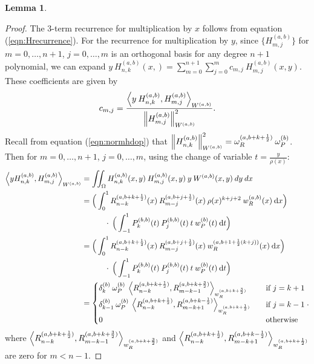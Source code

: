 \documentclass[11pt, oneside]{article}   	%
\newcommand{\half}{\frac{1}{2}}
\newcommand{\hdop}{H}
\newcommand{\hdopnkab}{\hdop_{n,k}^{(a,b)}}
\newcommand{\Wab}{{W^{(a,b)}}}
\newcommand{\hdopmjab}{\hdop_{m,j}^{(a,b)}}
\newcommand{\genjac}{R}
\newcommand{\genjacnmk}{\genjac_{n-k}}
\newcommand{\genjacmmj}{\genjac_{m-j}}
\newcommand{\genjacw}{w_\genjac}
\newcommand{\normgenjac}{\omega_\genjac}
\newcommand{\normjac}{\omega_P}
\newtheorem{lemma}{Lemma}
\begin{document}
\begin{lemma}
\end{lemma}

\begin{proof}
The 3-term recurrence for multiplication by $x$ follows from equation (\ref{eqn:Hrecurrence}). For the recurrence for multiplication by $y$, since $\{\hdopmjab\}$ for $m = 0,\dots,n+1$, $j = 0,\dots,m$ is an orthogonal basis for any degree $n+1$ polynomial, we can expand $y \: \hdopnkab(x,) = \sum_{m=0}^{n+1} \sum_{j=0}^m c_{m,j} \: \hdopmjab(x,y)$. These coefficients are given by
\begin{align*}
	c_{m,j} = \frac{\ip< y \: \hdopnkab, \hdopmjab >_{\Wab}}{\norm{\hdopmjab}^2_{\Wab}}.
\end{align*}
Recall from equation (\ref{eqn:normhdop}) that $\norm{\hdopnkab}_{\Wab}^2 = \normgenjac^{(a,b+k+\half)} \: \normjac^{(b)}$. Then for $m = 0,\dots,n+1$, $j = 0,\dots,m$, using the change of variable $t = \frac{y}{\rho(x)}$:
\begin{align*}
	\ip<y \hdopnkab, \hdopmjab>_\Wab &=  \iint_\Omega \hdopnkab(x,y) \: \hdopmjab(x,y) \: y \: \Wab(x,y) \: dy \: dx \\
	&= \Big( \int^1_0 \genjacnmk^{(a, b+k+\half)}(x) \: \genjacmmj^{(a, b+j+\half)}(x) \: \rho(x)^{k+j+2} \: \genjacw^{(a, b)}(x) \: \D x \Big) \nonumber \\
	& \quad \quad \quad\cdot \: \Big( \int^1_{-1} P_k^{(b,b)}(t) \: P_j^{(b,b)}(t) \: t \: w_P^{(b)}(t) \: \D t \Big) \\
	&= \Big( \int^1_0 \genjacnmk^{(a, b+k+\half)}(x) \: \genjacmmj^{(a, b+j+\half)}(x) \: \genjacw^{(a, b+1+\half(k+j))}(x) \: \D x \Big) \nonumber \\
	& \quad \quad \quad\cdot \: \Big( \int^1_{-1} P_k^{(b,b)}(t) \: P_j^{(b,b)}(t) \: t \: w_P^{(b)}(t) \: \D t \Big) \\
	&= 
	\begin{cases}
    		\delta_k^{(b)} \: \normjac^{(b)} \: \ip<\genjacnmk^{(a, b+k+\half)}, \genjac_{m-k-1}^{(a, b+k+\frac{3}{2})}>_{\genjacw^{(a, b+k+\frac{3}{2})}} \quad& \text{if } j = k+1 \\
		\delta_{k-1}^{(b)} \: \normjac^{(b)} \: \ip<\genjacnmk^{(a, b+k+\half)}, \genjac_{m-k+1}^{(a, b+k-\half)}>_{\genjacw^{(a, b+k+\half)}} \quad& \text{if } j = k-1 \\
		0 & \text{otherwise}
      	\end{cases}.
\end{align*}
where $\ip<\genjacnmk^{(a, b+k+\half)}, \genjac_{m-k-1}^{(a, b+k+\frac{3}{2})}>_{\genjacw^{(a, b+k+\frac{3}{2})}}$ and $\ip<\genjacnmk^{(a, b+k+\half)}, \genjac_{m-k+1}^{(a, b+k-\half)}>_{\genjacw^{(a, b+k+\half)}}$ are zero for $m < n-1$.

\end{proof}
\end{document}
